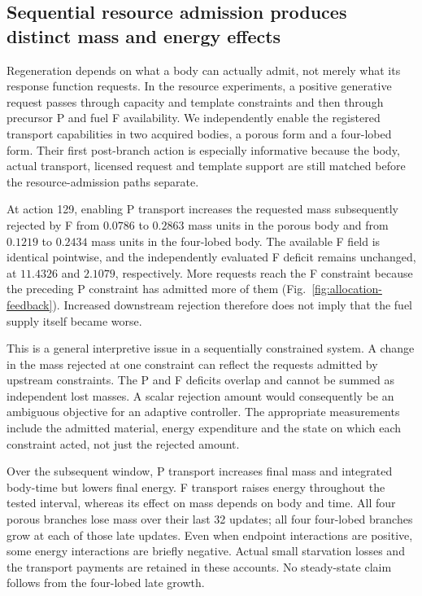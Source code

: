 



\subsection*{Sequential resource admission produces distinct mass and energy effects}

Regeneration depends on what a body can actually admit, not merely what its response function requests. In the resource experiments, a positive generative request passes through capacity and template constraints and then through precursor P and fuel F availability. We independently enable the registered transport capabilities in two acquired bodies, a porous form and a four-lobed form. Their first post-branch action is especially informative because the body, actual transport, licensed request and template support are still matched before the resource-admission paths separate.

At action 129, enabling P transport increases the requested mass subsequently rejected by F from $0.0786$ to $0.2863$ mass units in the porous body and from $0.1219$ to $0.2434$ mass units in the four-lobed body. The available F field is identical pointwise, and the independently evaluated F deficit remains unchanged, at $11.4326$ and $2.1079$, respectively. More requests reach the F constraint because the preceding P constraint has admitted more of them (Fig.~\ref{fig:allocation-feedback}). Increased downstream rejection therefore does not imply that the fuel supply itself became worse.

This is a general interpretive issue in a sequentially constrained system. A change in the mass rejected at one constraint can reflect the requests admitted by upstream constraints. The P and F deficits overlap and cannot be summed as independent lost masses. A scalar rejection amount would consequently be an ambiguous objective for an adaptive controller. The appropriate measurements include the admitted material, energy expenditure and the state on which each constraint acted, not just the rejected amount.



Over the subsequent window, P transport increases final mass and integrated body-time but lowers final energy. F transport raises energy throughout the tested interval, whereas its effect on mass depends on body and time. All four porous branches lose mass over their last 32 updates; all four four-lobed branches grow at each of those late updates. Even when endpoint interactions are positive, some energy interactions are briefly negative. Actual small starvation losses and the transport payments are retained in these accounts. No steady-state claim follows from the four-lobed late growth.


